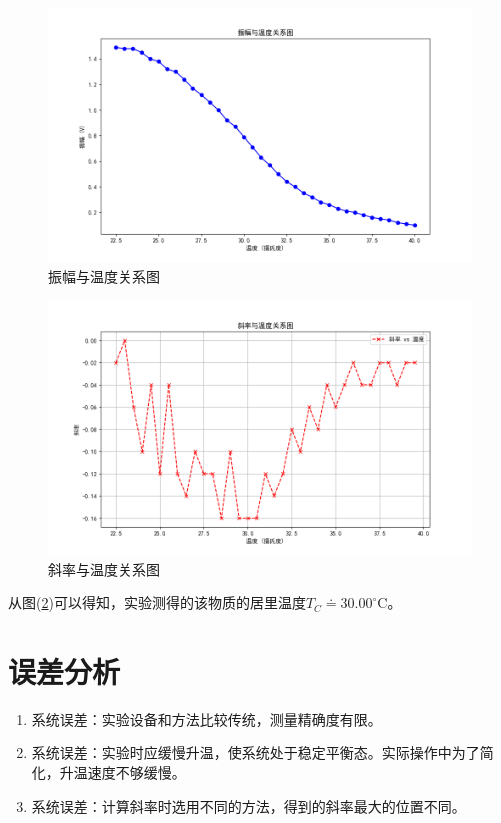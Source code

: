 \documentclass[a4paper]{article}
\begin{document}
\begin{figure}[H]
\centering
\includegraphics[width=\textwidth]{data/Figure_1.png}
\caption{振幅与温度关系图}
\label{data:fig1}

\end{figure}
\begin{figure}[H]
\centering
\includegraphics[width=\textwidth]{data/Figure_2.png}
\caption{斜率与温度关系图}
\label{data:fig2}
\end{figure}

从图(\ref{data:fig2})可以得知，实验测得的该物质的居里温度$T_C\doteq 30.00 ^{\circ}$C。

\section{误差分析}
\begin{enumerate}
    \item 系统误差：实验设备和方法比较传统，测量精确度有限。
    \item 系统误差：实验时应缓慢升温，使系统处于稳定平衡态。实际操作中为了简化，升温速度不够缓慢。
    \item 系统误差：计算斜率时选用不同的方法，得到的斜率最大的位置不同。
\end{enumerate}
\end{document}
